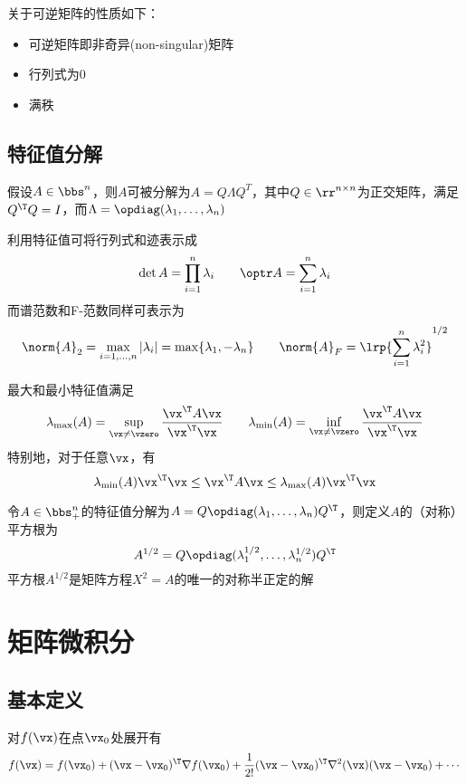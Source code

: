 关于可逆矩阵的性质如下：
\begin{itemize}
    \item 可逆矩阵即非奇异(non-singular)矩阵
    \item 行列式为$0$
    \item 满秩
\end{itemize}

\subsection{特征值分解}
\begin{definition}
假设$A\in\bbs^n$，则$A$可被分解为$A=Q\Lambda Q^T$，其中$Q\in\rr^{n\times n}$为正交矩阵，满足$Q^\T Q=I$，而$\Lambda=\opdiag(\lambda_1,\ldots,\lambda_n)$
\end{definition}

利用特征值可将行列式和迹表示成
\[\det A=\prod_{i=1}^n\lambda_i\qquad\optr A=\sum_{i=1}^n\lambda_i\]
而谱范数和F-范数同样可表示为
\[\norm{A}_2=\max_{i=1,\ldots,n}|\lambda_i|=\max\{\lambda_1,-\lambda_n\}\qquad\norm{A}_F=\lrp{\sum_{i=1}^n\lambda_i^2}^{1/2}\]

最大和最小特征值满足
\[\lambda_{\max}(A)=\sup_{\vx\ne\vzero}\frac{\vx^\T A\vx}{\vx^\T\vx}\qquad\lambda_{\min}(A)=\inf_{\vx\ne\vzero}\frac{\vx^\T A\vx}{\vx^\T\vx}\]
特别地，对于任意$\vx$，有
\[\lambda_{\min}(A)\vx^\T\vx\leq\vx^\T A\vx\leq\lambda_{\max}(A)\vx^\T\vx\]

令$A\in\bbs_+^n$的特征值分解为$A=Q\opdiag(\lambda_1,\ldots,\lambda_n)Q^\T$，则定义$A$的（对称）平方根为
\[A^{1/2}=Q\opdiag(\lambda_1^{1/2},\ldots,\lambda_n^{1/2})Q^\T\]
平方根$A^{1/2}$是矩阵方程$X^2=A$的唯一的对称半正定的解

\section{矩阵微积分}
\label{appendix:matrix}
\subsection{基本定义}
\begin{definition}[Taylor公式]
对$f(\vx)$在点$\vx_0$处展开有
\[f(\vx)=f(\vx_0)+(\vx-\vx_0)^\T\nabla f(\vx_0)+\frac{1}{2!}(\vx-\vx_0)^\T \nabla^2(\vx)(\vx-\vx_0)+\cdots\]
\end{definition}


